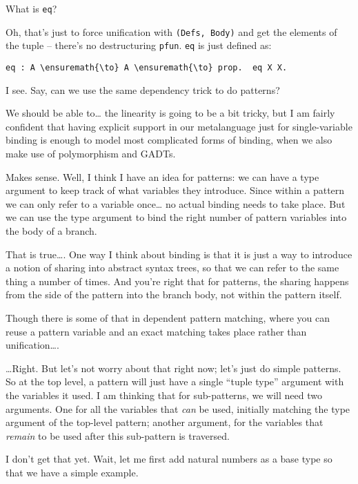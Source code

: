 \heroSTUDENT{} What is \texttt{eq}?

\heroADVISOR{} Oh, that's just to force unification with
\texttt{(Defs,\ Body)} and get the elements of the tuple -- there's no
destructuring \texttt{pfun}. \texttt{eq} is just defined as:

\begin{verbatim}
eq : A \ensuremath{\to} A \ensuremath{\to} prop.  eq X X.
\end{verbatim}

\heroSTUDENT{} I see. Say, can we use the same dependency trick to do
patterns?

\heroADVISOR{} We should be able to\ldots{} the linearity is going to be a bit
tricky, but I am fairly confident that having explicit support in our
metalanguage just for single-variable binding is enough to model most
complicated forms of binding, when we also make use of polymorphism and
GADTs.

\heroSTUDENT{} Makes sense. Well, I think I have an idea for patterns: we can
have a type argument to keep track of what variables they introduce.
Since within a pattern we can only refer to a variable once\ldots{} no
actual binding needs to take place. But we can use the type argument to
bind the right number of pattern variables into the body of a branch.

\heroADVISOR{} That is true\ldots{}. One way I think about binding is that it
is just a way to introduce a notion of sharing into abstract syntax
trees, so that we can refer to the same thing a number of times. And
you're right that for patterns, the sharing happens from the side of the
pattern into the branch body, not within the pattern itself.

\heroSTUDENT{} Though there is some of that in dependent pattern matching,
where you can reuse a pattern variable and an exact matching takes place
rather than unification\ldots{}.

\heroADVISOR{} \ldots{}Right. But let's not worry about that right now; let's
just do simple patterns. So at the top level, a pattern will just have a
single ``tuple type'' argument with the variables it used. I am thinking
that for sub-patterns, we will need two arguments. One for all the
variables that \emph{can} be used, initially matching the type argument
of the top-level pattern; another argument, for the variables that
\emph{remain} to be used after this sub-pattern is traversed.

\heroSTUDENT{} I don't get that yet. Wait, let me first add natural numbers as
a base type so that we have a simple example.

